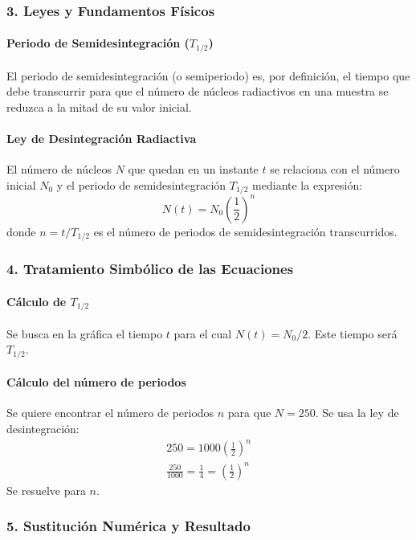 \subsubsection*{3. Leyes y Fundamentos Físicos}
\paragraph{Periodo de Semidesintegración ($T_{1/2}$)}
El periodo de semidesintegración (o semiperiodo) es, por definición, el tiempo que debe transcurrir para que el número de núcleos radiactivos en una muestra se reduzca a la mitad de su valor inicial.
\paragraph{Ley de Desintegración Radiactiva}
El número de núcleos $N$ que quedan en un instante $t$ se relaciona con el número inicial $N_0$ y el periodo de semidesintegración $T_{1/2}$ mediante la expresión:
$$ N(t) = N_0 \left(\frac{1}{2}\right)^{n} $$
donde $n = t/T_{1/2}$ es el número de periodos de semidesintegración transcurridos.

\subsubsection*{4. Tratamiento Simbólico de las Ecuaciones}
\paragraph{Cálculo de $T_{1/2}$}
Se busca en la gráfica el tiempo $t$ para el cual $N(t) = N_0/2$. Este tiempo será $T_{1/2}$.
\paragraph{Cálculo del número de periodos}
Se quiere encontrar el número de periodos $n$ para que $N=250$.
Se usa la ley de desintegración:
\begin{gather}
    250 = 1000 \left(\frac{1}{2}\right)^{n} \\
    \frac{250}{1000} = \frac{1}{4} = \left(\frac{1}{2}\right)^{n}
\end{gather}
Se resuelve para $n$.

\subsubsection*{5. Sustitución Numérica y Resultado}
